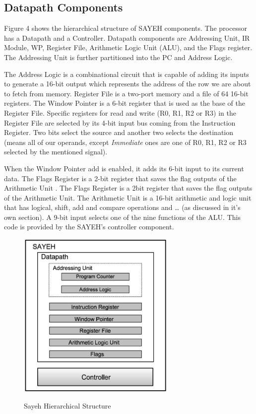 \documentclass{report}
\begin{document}
\subsection{Datapath Components}
Figure 4 shows the hierarchical structure of SAYEH components. The processor has a Datapath and a Controller. Datapath components are Addressing Unit, IR Module, WP, Register File, Arithmetic Logic Unit (ALU), and the Flags register. The Addressing Unit is further partitioned into the PC and Address Logic.
\par
The Address Logic is a combinational circuit that is capable of adding its inputs to generate a 16-bit output which represents the address of the row we are about to fetch from memory. Register File is a two-port memory and a file of 64 16-bit registers. The Window Pointer is a 6-bit register that is used as the base of the Register File. Specific registers for read and write (R0, R1, R2 or R3) in the Register File are selected by its 4-bit input bus coming from the Instruction Register. Two bits select the source and another two selects the destination (means all of our operands, except \textit{Immediate} ones are one of R0, R1, R2 or R3 selected by the mentioned signal).
\par
When the Window Pointer add is enabled, it adds its 6-bit input to its current data. The Flags Register is a 2-bit register that saves the flag outputs of the Arithmetic Unit . The Flags Register is a 2bit register that saves the flag outputs of the Arithmetic Unit. The Arithmetic Unit is a 16-bit arithmetic and logic unit that has logical, shift, add and compare operations and … (as discussed in it's own section). A 9-bit input selects one of the nine functions of the ALU. This code is provided by the SAYEH’s controller component.
\begin{figure}[ht]
	\centering
	\includegraphics[width=0.68\textwidth]{figs/fig4}\\
	\caption{Sayeh Hierarchical Structure}
\end{figure}
\end{document}
